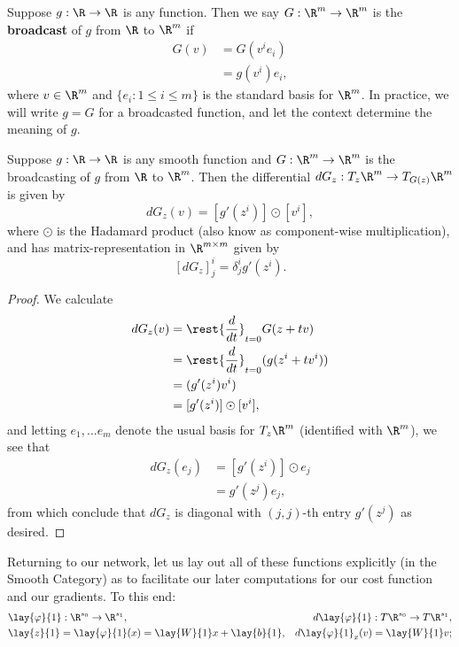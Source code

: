 \begin{defn}
	Suppose $g:\R\to\R$ is any function.  Then we say $G:\R^{m}\to\R^{m}$ is the \textbf{broadcast} of $g$ from $\R$ to $\R^m$ if
	\begin{align*}
		G(v)&=G(v^ie_i)\\
		&=g(v^i)e_i,
	\end{align*}
	where $v\in\R^{m}$ and $\{e_i:1\leq i\leq m\}$ is the standard basis for $\R^{m}$.  In practice, we will write $g=G$ for a broadcasted function, and let the context determine the meaning of $g$.
\end{defn}

\begin{lem}\label{lem: broadcastingDifferential}
	Suppose $g:\R\to\R$ is any smooth function and $G:\R^m\to\R^m$ is the broadcasting of $g$ from $\R$ to $\R^m$.  Then the differential $dG_z:T_z\R^m\to T_{G(z)}\R^m$ is given by
	$$dG_z(v)=[g'(z^i)]\odot [v^i],$$
	where $\odot$ is the Hadamard product (also know as component-wise multiplication), and has matrix-representation in $\R^{m\times m}$ given by
	$$[dG_z]^i_j =\delta^i_j g'(z^i).$$
\end{lem}

\begin{proof}
	We calculate
	\begin{align*}
		dG_z(v)&=\rest{\frac{d}{dt}}_{t=0}G(z+tv)\\
		&=\rest{\frac{d}{dt}}_{t=0}(g(z^i+tv^i))\\
		&=(g'(z^i)v^i)\\
		&=[g'(z^i)]\odot[v^i],
	\end{align*}
	and letting $e_1,...e_m$ denote the usual basis for $T_z\R^m$ (identified with $\R^m$), we see that
	\begin{align*}
		dG_z(e_j)&=[g'(z^i)]\odot e_j\\
		&=g'(z^j)e_j,
	\end{align*}
	from which conclude that $dG_z$ is diagonal with $(j,j)$-th entry $g'(z^j)$ as desired.
\end{proof}

Returning to our network, let us lay out all of these functions explicitly (in the Smooth Category) as to facilitate our later computations for our cost function and our gradients.
To this end:
\begin{align*}
	&\lay{\varphi}{1}:\R^{s_0}\to\R^{s_1},\qquad &d\lay{\varphi}{1}:T\R^{s_0}\to T\R^{s_1},\\
	&\lay{z}{1}=\lay{\varphi}{1}(x)=\lay{W}{1}x+\lay{b}{1},&d\lay{\varphi}{1}_x(v)=\lay{W}{1}v;
\end{align*}

